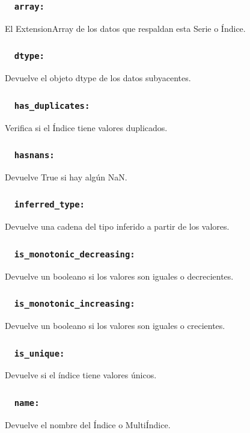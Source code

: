     \subsubsection{~\hspace{2em} \texttt{array:}} El ExtensionArray de los datos que respaldan esta Serie o Índice.
    \subsubsection{~\hspace{2em} \texttt{dtype:}} Devuelve el objeto dtype de los datos subyacentes.
    \subsubsection{~\hspace{2em} \texttt{has\_duplicates:}} Verifica si el Índice tiene valores duplicados.
    \subsubsection{~\hspace{2em} \texttt{hasnans:}} Devuelve True si hay algún NaN.
    \subsubsection{~\hspace{2em} \texttt{inferred\_type:}} Devuelve una cadena del tipo inferido a partir de los valores.
    \subsubsection{~\hspace{2em} \texttt{is\_monotonic\_decreasing:}} Devuelve un booleano si los valores son iguales o decrecientes.
    \subsubsection{~\hspace{2em} \texttt{is\_monotonic\_increasing:}} Devuelve un booleano si los valores son iguales o crecientes.
    \subsubsection{~\hspace{2em} \texttt{is\_unique:}} Devuelve si el índice tiene valores únicos.
    \subsubsection{~\hspace{2em} \texttt{name:}} Devuelve el nombre del Índice o MultiÍndice.
